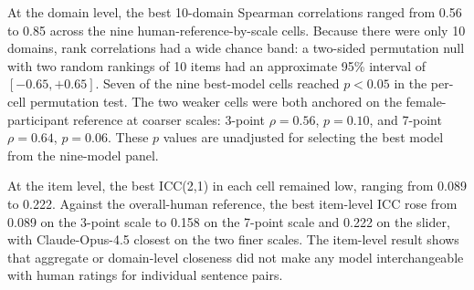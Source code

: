 \documentclass[a4paper,fleqn,review]{cas-sc}
\begin{document}
At the domain level, the best 10-domain Spearman correlations ranged from 0.56 to 0.85 across the nine human-reference-by-scale cells. Because there were only 10 domains, rank correlations had a wide chance band: a two-sided permutation null with two random rankings of 10 items had an approximate 95\% interval of $[-0.65, +0.65]$. Seven of the nine best-model cells reached $p<0.05$ in the per-cell permutation test. The two weaker cells were both anchored on the female-participant reference at coarser scales: 3-point $\rho=0.56$, $p=0.10$, and 7-point $\rho=0.64$, $p=0.06$. These $p$ values are unadjusted for selecting the best model from the nine-model panel.

At the item level, the best ICC(2,1) in each cell remained low, ranging from 0.089 to 0.222. Against the overall-human reference, the best item-level ICC rose from 0.089 on the 3-point scale to 0.158 on the 7-point scale and 0.222 on the slider, with Claude-Opus-4.5 closest on the two finer scales. The item-level result shows that aggregate or domain-level closeness did not make any model interchangeable with human ratings for individual sentence pairs.
\end{document}

